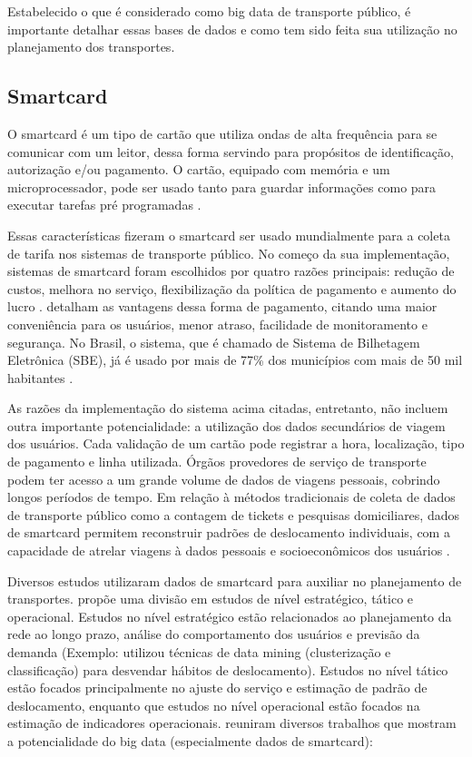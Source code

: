 \documentclass[        
    a4paper,          %
    12pt,             %
    chapter=TITLE,    %
    section=Title,    %
    subsection=Title, %
    oneside,          %
    english,          %
    spanish,          %
    brazil,           %
    fleqn             %
]{abntex2}
\begin{document}
  Estabelecido o que é considerado como big data de transporte público, é importante detalhar essas bases de dados e como tem sido feita sua utilização no planejamento dos transportes.
  
  \hypertarget{smartcard}{%
  \subsection{Smartcard}\label{smartcard}}
  
  O smartcard é um tipo de cartão que utiliza ondas de alta frequência para se comunicar com um leitor, dessa forma servindo para propósitos de identificação, autorização e/ou pagamento. O cartão, equipado com memória e um microprocessador, pode ser usado tanto para guardar informações como para executar tarefas pré programadas \citep{Pelletier2011}.
  
  Essas características fizeram o smartcard ser usado mundialmente para a coleta de tarifa nos sistemas de transporte público. No começo da sua implementação, sistemas de smartcard foram escolhidos por quatro razões principais: redução de custos, melhora no serviço, flexibilização da política de pagamento e aumento do lucro \citep{McDonald2000}. \citet{Pelletier2011} detalham as vantagens dessa forma de pagamento, citando uma maior conveniência para os usuários, menor atraso, facilidade de monitoramento e segurança. No Brasil, o sistema, que é chamado de Sistema de Bilhetagem Eletrônica (SBE), já é usado por mais de 77\% dos municípios com mais de 50 mil habitantes \citep{Correa2013}.
  
  As razões da implementação do sistema acima citadas, entretanto, não incluem outra importante potencialidade: a utilização dos dados secundários de viagem dos usuários. Cada validação de um cartão pode registrar a hora, localização, tipo de pagamento e linha utilizada. Órgãos provedores de serviço de transporte podem ter acesso a um grande volume de dados de viagens pessoais, cobrindo longos períodos de tempo. Em relação à métodos tradicionais de coleta de dados de transporte público como a contagem de tickets e pesquisas domiciliares, dados de smartcard permitem reconstruir padrões de deslocamento individuais, com a capacidade de atrelar viagens à dados pessoais e socioeconômicos dos usuários \citep{Bagchi2005}.
  
  Diversos estudos utilizaram dados de smartcard para auxiliar no planejamento de transportes. \citet{Pelletier2011} propõe uma divisão em estudos de nível estratégico, tático e operacional. Estudos no nível estratégico estão relacionados ao planejamento da rede ao longo prazo, análise do comportamento dos usuários e previsão da demanda (Exemplo: \citet{Agard2006} utilizou técnicas de data mining (clusterização e classificação) para desvendar hábitos de deslocamento). Estudos no nível tático estão focados principalmente no ajuste do serviço e estimação de padrão de deslocamento, enquanto que estudos no nível operacional estão focados na estimação de indicadores operacionais. \citet{Kurauchi2017} reuniram diversos trabalhos que mostram a potencialidade do big data (especialmente dados de smartcard):
  
\end{document}
